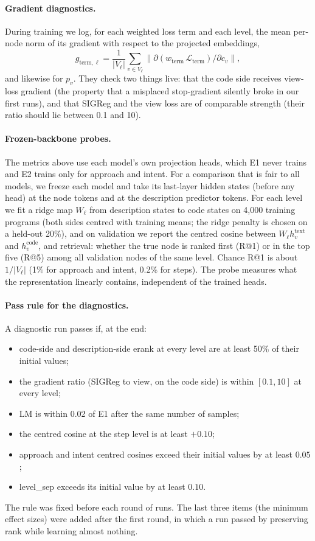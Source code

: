 \documentclass[11pt]{article}
\newcommand{\Lcal}{\mathcal{L}}
\begin{document}
\paragraph{Gradient diagnostics.}
During training we log, for each weighted loss term and each level, the mean per-node norm of its gradient with
respect to the projected embeddings,
\[
g_{\text{term},\ell}=\frac{1}{|V_\ell|}\sum_{v\in V_\ell}\bigl\lVert\partial(w_{\text{term}}\,\Lcal_{\text{term}})/\partial c_v\bigr\rVert,
\]
and likewise for $p_v$. They check two things live: that the code side receives view-loss gradient
(the property that a misplaced stop-gradient silently broke in our first runs), and that SIGReg and the view loss
are of comparable strength (their ratio should lie between 0.1 and 10).

\paragraph{Frozen-backbone probes.}
The metrics above use each model's own projection heads, which E1 never trains and E2 trains only for approach and
intent. For a comparison that is fair to all models, we freeze each model and take its last-layer hidden states
(before any head) at the node tokens and at the description predictor tokens. For each level we fit a ridge map
$W_\ell$ from description states to code states on 4{,}000 training programs (both sides centred with training
means; the ridge penalty is chosen on a held-out 20\%), and on validation we report the centred cosine between
$W_\ell h^{\text{text}}_v$ and $h^{\text{code}}_v$, and retrieval: whether the true node is ranked first (R@1) or
in the top five (R@5) among all validation nodes of the same level. Chance R@1 is about $1/|V_\ell|$ (1\% for
approach and intent, 0.2\% for steps). The probe measures what the representation linearly contains, independent of
the trained heads.

\paragraph{Pass rule for the diagnostics.}
A diagnostic run passes if, at the end:
\begin{itemize}
  \item code-side and description-side erank at every level are at least 50\% of their initial values;
  \item the gradient ratio (SIGReg to view, on the code side) is within $[0.1, 10]$ at every level;
  \item LM is within 0.02 of E1 after the same number of samples;
  \item the centred cosine at the step level is at least $+0.10$;
  \item approach and intent centred cosines exceed their initial values by at least $0.05$;
  \item level\_sep exceeds its initial value by at least $0.10$.
\end{itemize}
The rule was fixed before each round of runs. The last three items (the minimum effect sizes) were added after the
first round, in which a run passed by preserving rank while learning almost nothing.
\end{document}
